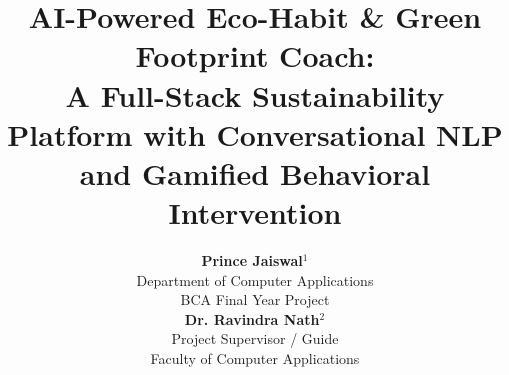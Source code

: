 \documentclass[12pt,a4paper]{article}
\begin{document}
\title{\textbf{AI-Powered Eco-Habit \& Green Footprint Coach:\\A Full-Stack Sustainability Platform with Conversational NLP\\and Gamified Behavioral Intervention}}

\author{%
\begin{minipage}[t]{0.46\textwidth}\centering
\textbf{Prince Jaiswal$^1$}\\
\small Department of Computer Applications\\
\small BCA Final Year Project
\end{minipage}
\hfill
\begin{minipage}[t]{0.46\textwidth}\centering
\textbf{Dr. Ravindra Nath$^2$}\\
\small Project Supervisor / Guide\\
\small Faculty of Computer Applications
\end{minipage}}
\date{}
\maketitle
\end{document}
